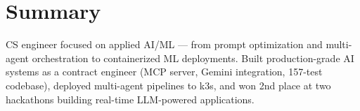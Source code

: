 \section{Summary}
\small{
    CS engineer focused on applied AI/ML --- from prompt optimization and multi-agent orchestration to containerized ML deployments. 
    Built production-grade AI systems as a contract engineer (MCP server, Gemini integration, 157-test codebase), deployed multi-agent pipelines to k3s, 
    and won 2nd place at two hackathons building real-time LLM-powered applications.
}
